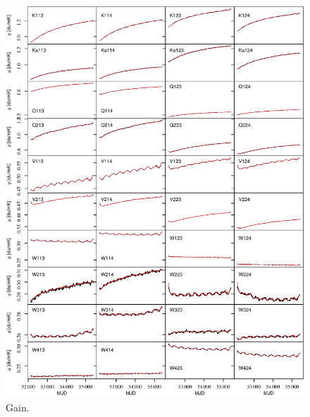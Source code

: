 \documentclass[twocolumn]{../../common/aa}
\begin{document}
\begin{figure}[p]
	\centering
	\includegraphics[width=\textwidth]{figures/instpar_CG_gain_v1.pdf}
	\caption{Gain.}
	\label{fig:gain}
\end{figure}
\end{document}
